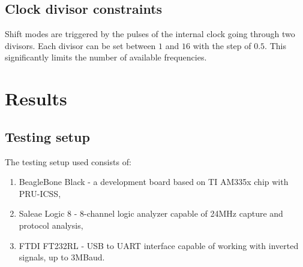 \documentclass[a4,11pt]{article}
\begin{document}
 \subsection{Clock divisor constraints}
 Shift modes are triggered by the pulses of the internal clock going through two divisors. Each divisor can be set between $1$ and $16$ with the step of $0.5$. This significantly limits the number of available frequencies.

 \section{Results}

 \subsection{Testing setup}
 The testing setup used consists of:
 \begin{enumerate}
     \item BeagleBone Black - a development board based on TI AM335x chip with PRU-ICSS,
     \item Saleae Logic 8 - 8-channel logic analyzer capable of 24MHz capture and protocol analysis,
     \item FTDI FT232RL - USB to UART interface capable of working with inverted signals, up to 3MBaud.
 \end{enumerate}
\end{document}
